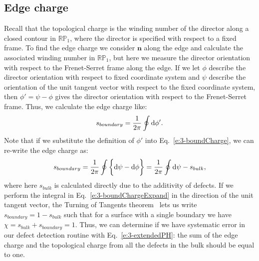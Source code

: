 \subsection{Edge charge}
Recall that the topological charge is the winding number of the director along a closed contour in $\mathbb{R}\mathbb{P}_1$, where the director is specified with respect to a fixed frame.
To find the edge charge we consider $\mathbf{n}$ along the edge and calculate the associated winding number in $\mathbb{R}\mathbb{P}_1$, but here we measure the director orientation with respect to the Frenet-Serret frame along the edge.
If we let $\phi$ describe the director orientation with respect to fixed coordinate system and $\psi$ describe the orientation of the unit tangent vector with respect to the fixed coordinate system, then $\phi' = \psi-\phi$ gives the director orientation with respect to the Frenet-Serret frame.
Thus, we calculate the edge charge like:
\begin{equation}
  s_{boundary} = \frac{1}{2\pi} \oint \textup{d}\phi'\label{e:3-boundCharge}.
\end{equation}
Note that if we substitute the definition of $\phi'$ into Eq.~\ref{e:3-boundCharge}, we can re-write the edge charge as:
\begin{equation}
  s_{boundary} = \frac{1}{2\pi} \oint \bigg \{ \textup{d}\psi - \textup{d}\phi \bigg \} = \frac{1}{2\pi} \oint \textup{d}\psi - s_{bulk}\label{e:3-boundChargeExpand},
\end{equation}
where here $s_{bulk}$ is calculated directly due to the additivity of defects.
If we perform the integral in Eq.~\ref{e:3-boundChargeExpand} in the direction of the unit tangent vector, the Turning of Tangents theorem~\cite{RN35} lets us write $s_{boundary} = 1 - s_{bulk}$ such that for a surface with a single boundary we have $\chi = s_{bulk} + s_{boundary} = 1$.
Thus, we can determine if we have systematic error in our defect detection routine with Eq.~\ref{e:3-extendedPH}: the sum of the edge charge and the topological charge from all the defects in the bulk should be equal to one.\\

